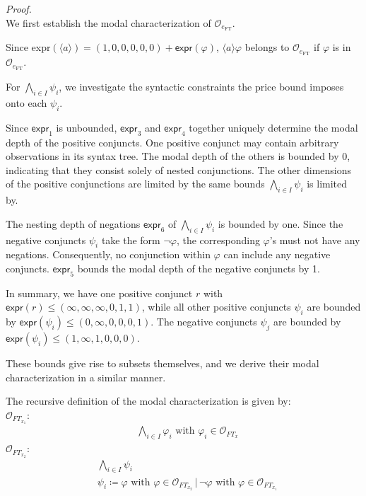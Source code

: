 \begin{isabellebody}
\begin{isamarkuptext}
\textit{Proof.} \\
We first establish the modal characterization of $\mathcal{O}_{e_{\text{FT}}}$.

Since \textsf{expr}$(\langle a \rangle) = (1, 0, 0, 0, 0, 0) + \textsf{expr}(\varphi)$, $\langle a \rangle \varphi$ belongs to $\mathcal{O}_{e_{\text{FT}}}$ if $\varphi$ is in $\mathcal{O}_{e_{\text{FT}}}$.

For $\bigwedge_{i\in I}\psi_i$, we investigate the syntactic constraints the price bound imposes onto each $\psi_i$.

Since $\textsf{expr}_1$ is unbounded, $\textsf{expr}_3$ and $\textsf{expr}_4$ together uniquely determine the modal depth of the positive conjuncts. 
One positive conjunct may contain arbitrary observations in its syntax tree. The modal depth of the others is bounded by 0, indicating that they consist solely of nested conjunctions.
The other dimensions of the positive conjunctions are limited by the same bounds $\bigwedge_{i\in I}\psi_i$ is limited by.

The nesting depth of negations $\textsf{expr}_6$ of $\bigwedge_{i\in I}\psi_i$ is bounded by one. Since the negative conjuncts $\psi_i$ take the form $\neg \varphi$, the corresponding $\varphi$'s must not have any negations.
Consequently, no conjunction within $\varphi$ can include any negative conjuncts. $\textsf{expr}_5$ bounds the modal depth of the negative conjuncts by 1. 

In summary, we have one positive conjunct $r$ with $\textsf{expr}(r) \leq (\infty, \infty, \infty, 0, 1, 1)$, while all other positive conjuncts $\psi_i$ are bounded by $\textsf{expr}(\psi_i) \leq (0, \infty, 0, 0, 0, 1)$. The negative conjuncts $\psi_j$ are bounded by $\textsf{expr}(\psi_i) \leq (1, \infty, 1, 0, 0, 0)$.

These bounds give rise to subsets themselves, and we derive their modal characterization in a similar manner.

The recursive definition of the modal characterization is given by:\\
$\mathcal{O}_{FT_{x_1}}$:\\
\begin{align*}
&\bigwedge_{i\in I} \varphi_i\text{ with }\varphi_i\in\mathcal{O}_{FT_x}
\end{align*}
$\mathcal{O}_{FT_{x_2}}$:\\
\begin{align*}
&\bigwedge_{i\in I} \psi_i\\
&\psi_i \coloneqq \varphi \text{ with }\varphi\in\mathcal{O}_{FT_{x_2}}\,|\,\lnot\varphi\text{ with }\varphi\in\mathcal{O}_{FT_{x_1}}
\end{align*}


\end{isamarkuptext}
\end{isabellebody}
